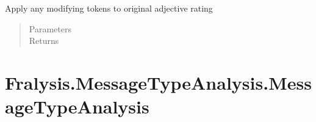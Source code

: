 \documentclass[letterpaper,10pt,english]{sphinxmanual}
\begin{document}
\begin{fulllineitems}
\label{\detokenize{index:Fralysis.AnalyseDream.match_dreams}}
Apply any modifying tokens to original adjective rating
\begin{quote}\begin{description}
\item[{Parameters}] \leavevmode
{} \textendash{} 

\item[{Returns}] \leavevmode


\end{description}\end{quote}

\end{fulllineitems}



\chapter{Fralysis.MessageTypeAnalysis.MessageTypeAnalysis}
\label{\detokenize{index:fralysis-messagetypeanalysis-messagetypeanalysis}}
\end{document}
